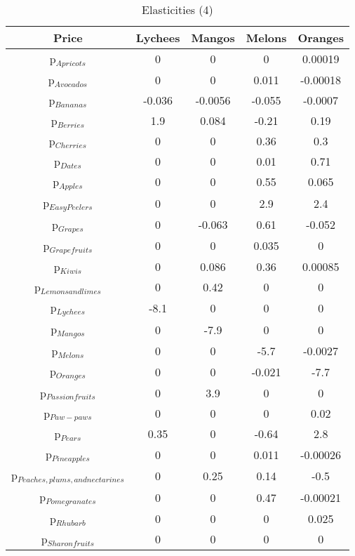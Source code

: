 \documentclass[11pt]{article}
\begin{document}
\begin{table}[h]
\caption{Elasticities (4)}
\label{Table: elasticities 4}
\begin{center}
\begin{tabular}{ccccc}
Price & Lychees & Mangos & Melons & Oranges \\ \hline
p$_{Apricots}$ & 0 & 0 & 0 & 0.00019 \\ 
p$_{Avocados}$ & 0 & 0 & 0.011 & -0.00018 \\ 
p$_{Bananas}$ & -0.036 & -0.0056 & -0.055 & -0.0007 \\ 
p$_{Berries}$ & 1.9 & 0.084 & -0.21 & 0.19 \\ 
p$_{Cherries}$ & 0 & 0 & 0.36 & 0.3 \\ 
p$_{Dates}$ & 0 & 0 & 0.01 & 0.71 \\ 
p$_{Apples}$ & 0 & 0 & 0.55 & 0.065 \\ 
p$_{Easy Peelers}$ & 0 & 0 & 2.9 & 2.4 \\ 
p$_{Grapes}$ & 0 & -0.063 & 0.61 & -0.052 \\ 
p$_{Grapefruits}$ & 0 & 0 & 0.035 & 0 \\ 
p$_{Kiwis}$ & 0 & 0.086 & 0.36 & 0.00085 \\ 
p$_{Lemons and limes}$ & 0 & 0.42 & 0 & 0 \\ 
p$_{Lychees}$ & -8.1 & 0 & 0 & 0 \\ 
p$_{Mangos}$ & 0 & -7.9 & 0 & 0 \\ 
p$_{Melons}$ & 0 & 0 & -5.7 & -0.0027 \\ 
p$_{Oranges}$ & 0 & 0 & -0.021 & -7.7 \\ 
p$_{Passion fruits}$ & 0 & 3.9 & 0 & 0 \\ 
p$_{Paw-paws}$ & 0 & 0 & 0 & 0.02 \\ 
p$_{Pears}$ & 0.35 & 0 & -0.64 & 2.8 \\ 
p$_{Pineapples}$ & 0 & 0 & 0.011 & -0.00026 \\ 
p$_{Peaches, plums, and nectarines}$ & 0 & 0.25 & 0.14 & -0.5 \\ 
p$_{Pomegranates}$ & 0 & 0 & 0.47 & -0.00021 \\ 
p$_{Rhubarb}$ & 0 & 0 & 0 & 0.025 \\ 
p$_{Sharon fruits}$ & 0 & 0 & 0 & 0 \\ 
\end{tabular}
\end{center}
\end{table}
\end{document}
